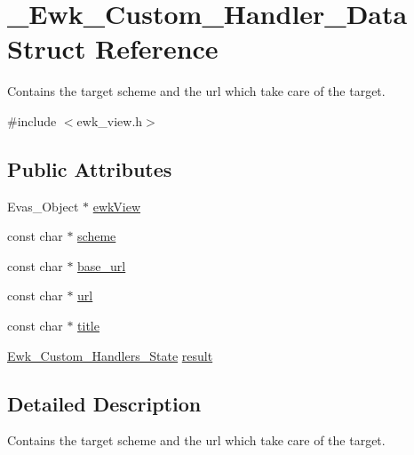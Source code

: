 \hypertarget{struct__Ewk__Custom__Handler__Data}{\section{\+\_\+\+Ewk\+\_\+\+Custom\+\_\+\+Handler\+\_\+\+Data Struct Reference}
\label{struct__Ewk__Custom__Handler__Data}
}


Contains the target scheme and the url which take care of the target.  




{\ttfamily \#include $<$ewk\+\_\+view.\+h$>$}

\subsection*{Public Attributes}
\begin{DoxyCompactItemize}
\item 
Evas\+\_\+\+Object $\ast$ \hyperlink{struct__Ewk__Custom__Handler__Data_aac0742cbb7f855d5f15880f8af398d4f}{ewk\+View}
\item 
const char $\ast$ \hyperlink{struct__Ewk__Custom__Handler__Data_aa4f0a79fda24ef6298239c64026809ef}{scheme}
\item 
const char $\ast$ \hyperlink{struct__Ewk__Custom__Handler__Data_afe9e9ea292e4ee1b849591fa013a4ad0}{base\+\_\+url}
\item 
const char $\ast$ \hyperlink{struct__Ewk__Custom__Handler__Data_a23d9bedd5c649538d1be8a5f40816ba9}{url}
\item 
const char $\ast$ \hyperlink{struct__Ewk__Custom__Handler__Data_a9a2966626116e34f7bce20375a3a11c0}{title}
\item 
\hyperlink{ewk__view_8h_ab43ee592bf7654e2f1da5874b5901416}{Ewk\+\_\+\+Custom\+\_\+\+Handlers\+\_\+\+State} \hyperlink{struct__Ewk__Custom__Handler__Data_aa781072df1c097837745795f0c2e74a7}{result}
\end{DoxyCompactItemize}


\subsection{Detailed Description}
Contains the target scheme and the url which take care of the target. 

